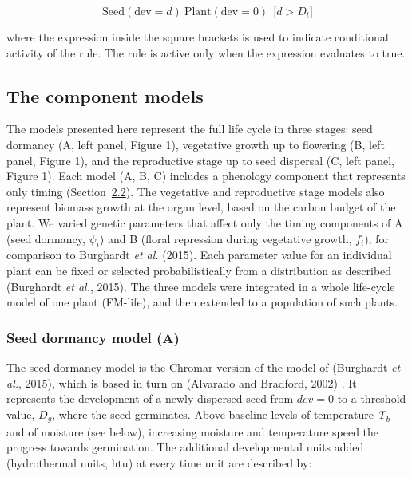 \documentclass[phd]{infthesis}
\begin{document}
\[\text{Seed}\left( \text{dev} = d \right)\ \text{Plant}\left( \text{dev} = 0 \right)\ \ \lbrack d > D_{t}\rbrack\]

where the expression inside the square brackets is used to indicate
conditional activity of the rule. The rule is active only when the
expression evaluates to true.

\subsection{The component models}
\label{the-component-models}

The models presented here represent the full life cycle in three stages:
seed dormancy (A, left panel, Figure 1), vegetative growth up to
flowering (B, left panel, Figure 1), and the reproductive stage up to
seed dispersal (C, left panel, Figure 1). Each model (A, B, C) includes
a phenology component that represents only timing
(Section~\protect\hyperlink{phenology-models-in-chromar}{2.2}). The
vegetative and reproductive stage models also represent biomass growth
at the organ level, based on the carbon budget of the plant. We varied
genetic parameters that affect only the timing components of A (seed
dormancy, \(\psi_{i}\)) and B (floral repression during vegetative
growth, \(f_{i}\)), for comparison to Burghardt \emph{et al.} (2015).
Each parameter value for an individual plant can be fixed or selected
probabilistically from a distribution as described (Burghardt \emph{et
al.}, 2015). The three models were integrated in a whole life-cycle
model of one plant (FM-life), and then extended to a population of such
plants.

\subsubsection{Seed dormancy model (A)}
\label{seed-dormancy-model-a}

The seed dormancy model is the Chromar version of the model of
(Burghardt \emph{et al.}, 2015), which is based in turn on (Alvarado and
Bradford, 2002) . It represents the development of a newly-dispersed
seed from \(dev = 0\) to a threshold value, \(D_{g}\), where the seed
germinates. Above baseline levels of temperature
\emph{T\textsubscript{b}} and of moisture (see below), increasing
moisture and temperature speed the progress towards germination. The
additional developmental units added (hydrothermal units,
\(\text{htu}\)) at every time unit are described by:
\end{document}
